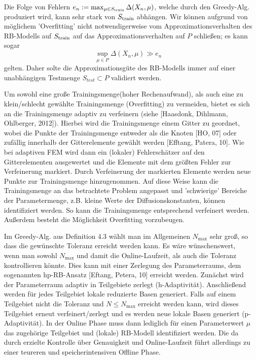 Die Folge von Fehlern $e_n := \max_{\mu\in S_{\operatorname{train}}}\Delta(X_n,\mu)$, welche durch den Greedy-Alg. produziert wird, kann sehr stark von $S_{\operatorname{train}}$ abhängen.
Wir können aufgrund von möglichem 'Overfitting' nicht notwendigerweise vom Approximationsverhalten des RB-Modells auf $S_{\operatorname{train}}$ auf das Approximationsverhalten auf $P$ schließen; es kann sogar 
\[
\sup\limits_{\mu\in P} \Delta(X_n,\mu) \gg e_n
\]
gelten.
Daher solte die Approximationsgüte des RB-Modells immer auf einer unabhängigen Testmenge $S_{test}\subset P$ validiert werden.

Um sowohl eine große Trainingsmenge(hoher Rechenaufwand), als auch eine zu klein/schlecht gewählte Trainingsmenge (Overfitting) zu vermeiden, bietet es sich an die Trainingsmenge adaptiv zu verfeinern (siehe [Haasdonk, Dihlmann, Ohlberger, 2012]). 
Hierbei wird die Trainingsmenge einem Gitter zu geordnet, wobei die Punkte der Trainingsmenge entweder als die Knoten [HO, 07] oder zufällig innerhalb der Gitterelemente gewählt werden [Efftang, Patera, 10].
Wie bei adaptiven FEM wird dann ein (lokaler) Fehlerschätzer auf den Gitterelementen ausgewertet und die Elemente mit dem größten Fehler zur Verfeinerung markiert.
Durch Verfeinerung der markierten Elemente werden neue Punkte zur Trainingsmenge hinzugenommen.
Auf diese Weise kann die Trainingsmenge an das betrachtete Problem angepasst und 'schwierige' Bereiche der Parametermenge, z.B. kleine Werte der Diffusionskonstanten, können identifiziert werden.
So kann die Trainingsmenge entsprechend verfeinert werden.
Außerdem besteht die Möglichkeit Overfitting vorzubeugen.

Im Greedy-Alg. aus Definition 4.3 wählt man im Allgemeinen $N_{\max}$ sehr groß, so dass die gewünschte Toleranz erreicht werden kann.
Es wäre wünschenswert, wenn man sowohl $N_{\max}$ und damit die Online-Laufzeit, als auch die Toleranz kontrollieren könnte.
Dies kann mit einer Zerlegung des Parameterraums, dem sogenannten hp-RB-Ansatz [Eftang, Petera, 10] erreicht werden.
Zunächst wird der Parameterraum adaptiv in Teilgebiete zerlegt (h-Adaptivität).
Anschließend werden für jedes Teilgebiet lokale reduzierte Basen generiert.
Falls auf einem Teilgebiet nicht die Toleranz und $N\le N_{\max}$ erreicht werden kann, wird dieses Teilgebiet erneut verfeinert/zerlegt und es werden neue lokale Basen generiert (p-Adaptivität).
In der Online Phase muss dann lediglich für einen Parameterwert $\mu$ das zugehörige Teilgebiet und (lokale) RB-Modell identifiziert werden.
Die da durch erzielte Kontrolle über Genauigkeit und Online-Laufzeit führt allerdings zu einer teureren und speicherintensiven Offline Phase.

